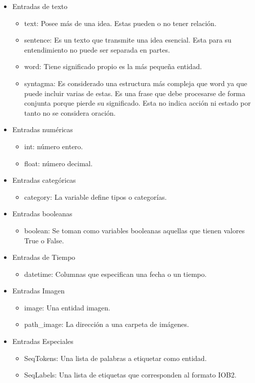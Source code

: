 \begin{itemize}
    \item Entradas de texto
    \begin{itemize}
        \item text: Posee más de una idea. Estas pueden o no tener relación.
        \item sentence: Es un texto que transmite una idea esencial. Esta para su entendimiento no puede ser separada en partes.
        \item word: Tiene significado propio es la más pequeña entidad.
        \item syntagma: Es considerado una estructura más compleja que word ya que puede incluir varias de estas. Es una frase 
        que debe procesarse de forma conjunta porque pierde su significado. Esta no indica acción ni estado por tanto no se considera oración. 
    \end{itemize}      
    
    \item Entradas numéricas
    \begin{itemize}
        \item int: número entero.
        \item float: número decimal.
    \end{itemize}

    \item Entradas categóricas
    \begin{itemize}
        \item category: La variable define tipos o categorías.
    \end{itemize}
    
    \item Entradas booleanas
    \begin{itemize}
        \item boolean: Se toman como variables booleanas aquellas que tienen valores True o False.
    \end{itemize}
    
    \item Entradas de Tiempo
    \begin{itemize}
        \item datetime: Columnas que especifican una fecha o un tiempo.
    \end{itemize}
    
    \item Entradas Imagen
    \begin{itemize}
        \item image: Una entidad imagen.
        \item path\_image: La dirección a una carpeta de imágenes.
    \end{itemize}


    \item Entradas Especiales
    \begin{itemize}
        \item SeqTokens: Una lista de palabras a etiquetar como entidad.
        \item SeqLabels: Una lista de etiquetas que corresponden al formato IOB2. 
    \end{itemize}
\end{itemize}

